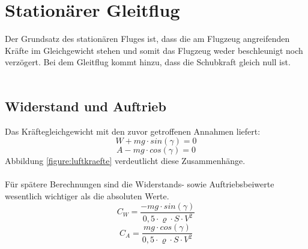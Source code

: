 \section{Stationärer Gleitflug}
Der Grundsatz des stationären Fluges ist, dass die am Flugzeug angreifenden Kräfte im Gleichgewicht stehen und somit das Flugzeug weder beschleunigt noch verzögert. Bei dem Gleitflug kommt hinzu, dass die Schubkraft gleich null ist.\\\\
\subsection{Widerstand und Auftrieb}
Das Kräftegleichgewicht mit den zuvor getroffenen Annahmen liefert:
\begin{equation}
\label{eq:kräftegleichgewichtWiderstand}
W + mg \cdot sin(\gamma) = 0
\end{equation}
%
%
%
\begin{equation}
\label{eq:kräftegleichgewichtAuftrieb}
A - mg \cdot cos(\gamma) = 0
\end{equation}
Abbildung \ref{figure:luftkraefte} verdeutlicht diese Zusammenhänge. \\  \\
Für spätere Berechnungen sind die Widerstands- sowie Auftriebsbeiwerte wesentlich wichtiger als die absoluten Werte.
\begin{equation} \label{eq:c_w}
C_W = \frac{-mg \cdot sin(\gamma)}{0,5  \cdot  \varrho  \cdot  S  \cdot  V^2}
\end{equation}
\begin{equation} \label{eq:c_a}
C_A = \frac{mg \cdot cos(\gamma)}{0,5  \cdot  \varrho  \cdot  S  \cdot  V^2}
\end{equation}
\vspace{10mm}
